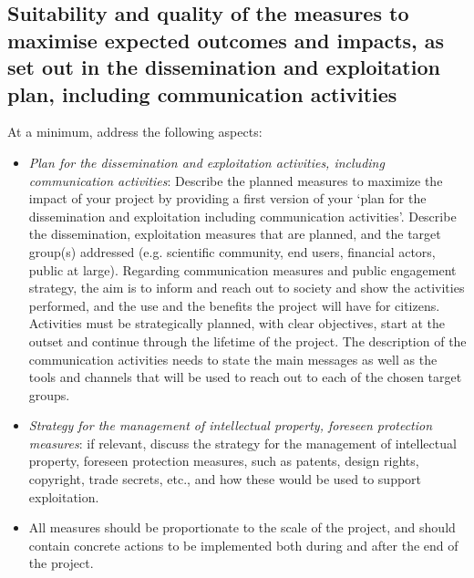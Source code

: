 \documentclass[11pt,draftproposal]{msca-pf}
\begin{document}
\subsection{Suitability and quality of the measures to maximise expected
outcomes and impacts, as set out in the dissemination and exploitation plan,
including communication activities }
\label{COM-DIS-VIS-CDV}

At a minimum, address the following aspects:

\begin{itemize}
    \item \emph{Plan for the dissemination and exploitation activities, including
    communication activities}\footnotemark{}: Describe the planned measures to
    maximize the impact of your project by providing a first version of your ‘plan
    for the dissemination and exploitation including communication activities’.
    Describe the dissemination, exploitation measures that are planned, and the target
    group(s) addressed (e.g. scientific community, end users, financial actors,
    public at large). Regarding communication measures and public engagement
    strategy, the aim is to inform and reach out to society and show the activities
    performed, and the use and the benefits the project will have for citizens.
    Activities must be strategically planned, with clear objectives, start at the
    outset and continue through the lifetime of the project. The description of
    the communication activities needs to state the main messages as well as the
    tools and channels that will be used to reach out to each of the chosen target
    groups.


    \item \emph{Strategy for the management of intellectual property, foreseen
    protection measures}: if relevant, discuss the strategy for the management
    of intellectual property, foreseen protection measures, such as patents,
    design rights, copyright, trade secrets, etc., and how these would be used
    to support exploitation.

    \item All measures should be proportionate to the scale of the project, and
    should contain concrete actions to be implemented both during and after the
    end of the project.
\end{itemize}
\end{document}
